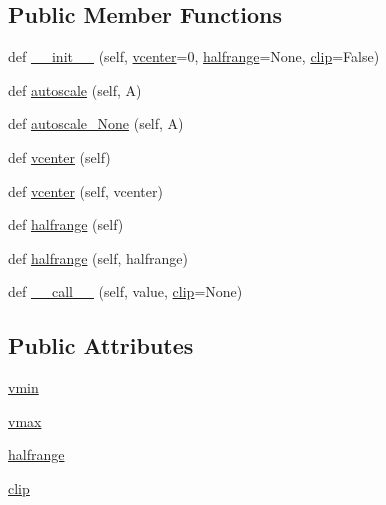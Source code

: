 \subsection*{Public Member Functions}
\begin{DoxyCompactItemize}
\item 
def \hyperlink{classmatplotlib_1_1colors_1_1CenteredNorm_a4b01eaf1c98c8708326040b6cba5a4c0}{\+\_\+\+\_\+init\+\_\+\+\_\+} (self, \hyperlink{classmatplotlib_1_1colors_1_1CenteredNorm_a92e9e004bc409f3f35e2cd844ea19445}{vcenter}=0, \hyperlink{classmatplotlib_1_1colors_1_1CenteredNorm_a10eb29f9a5eb38afea307e46e1900d72}{halfrange}=None, \hyperlink{classmatplotlib_1_1colors_1_1CenteredNorm_a040daa09c6b1ef9419e606e19ffcffd5}{clip}=False)
\item 
def \hyperlink{classmatplotlib_1_1colors_1_1CenteredNorm_ab69dacf5dcce416c35fb280f05ae7a4a}{autoscale} (self, A)
\item 
def \hyperlink{classmatplotlib_1_1colors_1_1CenteredNorm_a2f995e3e2336ad3fbd7fe9f1a067bd1e}{autoscale\+\_\+\+None} (self, A)
\item 
def \hyperlink{classmatplotlib_1_1colors_1_1CenteredNorm_a92e9e004bc409f3f35e2cd844ea19445}{vcenter} (self)
\item 
def \hyperlink{classmatplotlib_1_1colors_1_1CenteredNorm_a8f5fefacb570756bbc85b57815225041}{vcenter} (self, vcenter)
\item 
def \hyperlink{classmatplotlib_1_1colors_1_1CenteredNorm_a30a47769a24445d1ef0336d2015aca96}{halfrange} (self)
\item 
def \hyperlink{classmatplotlib_1_1colors_1_1CenteredNorm_a34e69a34f022a3a7ecded5e5886090c8}{halfrange} (self, halfrange)
\item 
def \hyperlink{classmatplotlib_1_1colors_1_1CenteredNorm_a2808fbd193f3b3a0f13529a9525c38f3}{\+\_\+\+\_\+call\+\_\+\+\_\+} (self, value, \hyperlink{classmatplotlib_1_1colors_1_1CenteredNorm_a040daa09c6b1ef9419e606e19ffcffd5}{clip}=None)
\end{DoxyCompactItemize}
\subsection*{Public Attributes}
\begin{DoxyCompactItemize}
\item 
\hyperlink{classmatplotlib_1_1colors_1_1CenteredNorm_afa8601ccfb1e9c8bc60ae5bc54a74bc6}{vmin}
\item 
\hyperlink{classmatplotlib_1_1colors_1_1CenteredNorm_a42a88bba0b713e674fde0f4354c1c450}{vmax}
\item 
\hyperlink{classmatplotlib_1_1colors_1_1CenteredNorm_a10eb29f9a5eb38afea307e46e1900d72}{halfrange}
\item 
\hyperlink{classmatplotlib_1_1colors_1_1CenteredNorm_a040daa09c6b1ef9419e606e19ffcffd5}{clip}
\end{DoxyCompactItemize}
